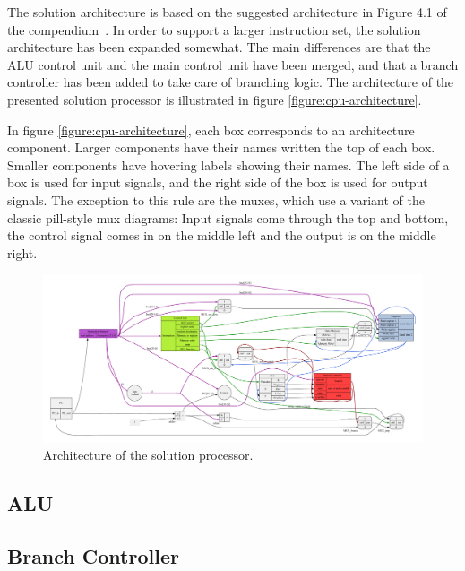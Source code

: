 The solution architecture is based on the suggested architecture in Figure 4.1 of the compendium~\cite[p.115]{compendium}.
In order to support a larger instruction set, the solution architecture has been expanded somewhat.
The main differences are that the ALU control unit and the main control unit have been merged, and that a branch controller has been added to take care of branching logic.
The architecture of the presented solution processor is illustrated in figure \vref{figure:cpu-architecture}.

In figure \vref{figure:cpu-architecture}, each box corresponds to an architecture component.
Larger components have their names written the top of each box.
Smaller components have hovering labels showing their names.
The left side of a box is used for input signals, and the right side of the box is used for output signals.
The exception to this rule are the muxes, which use a variant of the classic pill-style mux diagrams: Input signals come through the top and bottom, the control signal comes in on the middle left and the output is on the middle right.

\begin{figure}[h!]
	\begin{center}
		\includegraphics[keepaspectratio, height=\textheight, width=\textwidth]{graphics/cpu-architecture/cpu-architecture-color.pdf}
		\caption{Architecture of the solution processor.}
		\label{figure:cpu-architecture}
	\end{center}
\end{figure}

\subsection{ALU}



\subsection{Branch Controller}

